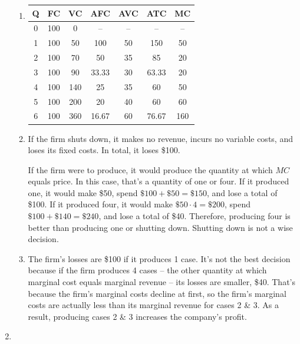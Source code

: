 \documentclass{article}
\begin{document}
\begin{enumerate}
\begin{enumerate}
	\item \phantom{x}
		\begin{center}
		\begin{tabular}{| c | c | c | c | c | c | c |}
		\hline
		Q & FC & VC & AFC & AVC & ATC & MC \\
		\hline
		0 & 100 & 0 & -- & -- & -- & --\\
		\hline
		1 & 100 & 50 & 100 & 50 & 150 & 50 \\
		\hline
		2 & 100 & 70 & 50 & 35 & 85 & 20 \\
		\hline
		3 & 100 & 90 & 33.33 & 30 & 63.33 & 20 \\
		\hline
		4 & 100 & 140 & 25 & 35 & 60 & 50 \\
		\hline
		5 & 100 & 200 & 20 & 40 & 60 & 60 \\
		\hline
		6 & 100 & 360 & 16.67 & 60 & 76.67 & 160 \\
		\hline
		\end{tabular}
		\end{center}
		
	\item If the firm shuts down, it makes no revenue, incurs no variable costs, and loses its fixed costs. In total, it loses \$100.
	
	If the firm were to produce, it would produce the quantity at which $MC$ equals price. In this case, that's a quantity of one or four. If it produced one, it would make \$50, spend $\$100 + \$50 = \$150$, and lose a total of \$100. If it produced four, it would make $\$50 \cdot 4 = \$200$, spend $\$100 + \$140 = \$240$, and lose a total of \$40. Therefore, producing four is better than producing one or shutting down. Shutting down is not a wise decision.
	
	\item The firm's losses are \$100 if it produces 1 case. It's not the best decision because if the firm produces 4 cases -- the other quantity at which marginal cost equals marginal revenue -- its losses are smaller, \$40. That's because the firm's marginal costs decline at first, so the firm's marginal costs are actually less than its marginal revenue for cases 2 \& 3. As a result, producing cases 2 \& 3 increases the company's profit.
	
	\end{enumerate}
	
\item

	\begin{enumerate}
	

\end{enumerate}
\end{enumerate}
\end{document}
